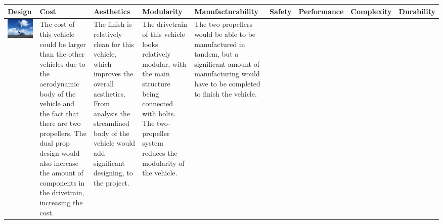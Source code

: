 \onecolumn
\newcommand\x{3.5cm} %
\begin{table}[p]
    \centering
    \begin{tabular}{|m{5cm}|m{\x}|m{\x}|m{\x}|m{\x}|m{\x}|m{\x}|m{\x}|m{\x}|}
      \hline
      \cellcolor[HTML]{\CellColor}\textbf{Design} &
      \cellcolor[HTML]{\CellColor}\textbf{Cost} &
      \cellcolor[HTML]{\CellColor}\textbf{Aesthetics} &
      \cellcolor[HTML]{\CellColor}\textbf{Modularity} &
      \cellcolor[HTML]{\CellColor}\textbf{Manufacturability} &
      \cellcolor[HTML]{\CellColor}\textbf{Safety} &
      \cellcolor[HTML]{\CellColor}\textbf{Performance} &
      \cellcolor[HTML]{\CellColor}\textbf{Complexity} &
      \cellcolor[HTML]{\CellColor}\textbf{Durability} 
      \\ \hline
      
      \includegraphics[width=\linewidth]{images/part1/exisitingVeh1.png}
      &
      The cost of this vehicle could be larger than the other vehicles due to the aerodynamic body of the vehicle and the fact that there are two propellers. The dual prop design would also increase the amount of components in the drivetrain, increasing the cost.
      & 
      The finish is relatively clean for this vehicle, which improves the overall aesthetics. From analysis the streamlined body of the vehicle would add significant designing, to the project. 
      &  
      The drivetrain of this vehicle looks relatively modular, with the main structure being connected with bolts. The two-propeller system reduces the modularity of the vehicle.
      & 
      The two propellers would be able to be manufactured in tandem, but a significant amount of manufacturing would have to be completed to finish the vehicle.  

\end{tabular}
\end{table}

